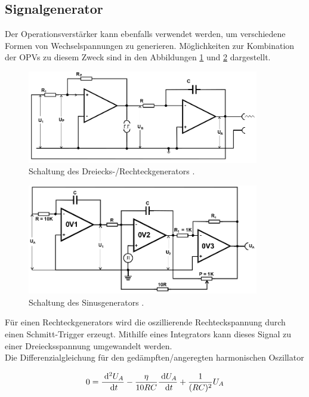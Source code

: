\subsection{Signalgenerator}
Der Operationsverstärker kann ebenfalls verwendet werden, um verschiedene Formen
von Wechselspannungen zu generieren. Möglichkeiten zur Kombination der OPVs 
zu diesem Zweck sind in den Abbildungen \ref{pic:dreiRect}
und \ref{pic:sinus} dargestellt.
\begin{figure}[t]
 \includegraphics[width = 0.9\textwidth]{../pics/DreiRect.png}
 \caption{Schaltung des Dreiecks-/Rechteckgenerators \cite{Anl}.}
 \label{pic:dreiRect}
\end{figure}
\begin{figure}[t]
 \includegraphics[width = 0.9\textwidth]{../pics/sinus.png}
 \caption{Schaltung des Sinusgenerators \cite{Anl}.}
 \label{pic:sinus}
\end{figure}
Für einen Rechteckgenerators wird die oszillierende Rechteckspannung durch einen
Schmitt-Trigger erzeugt. Mithilfe eines Integrators kann dieses Signal 
zu einer Dreiecksspannung umgewandelt werden.\\
\noindent Die Differenzialgleichung für den gedämpften/angeregten
harmonischen Oszillator

\begin{align}
 0 = \frac{\; \mathrm{d}^2 U_A}{\; \mathrm{d} t}- \frac{\eta}{10 RC} \frac{\; \mathrm{d} U_A}{\; \mathrm{d} t} + \frac{1}{(RC)^2}U_A
 \label{eq:dgl}
\end{align}

